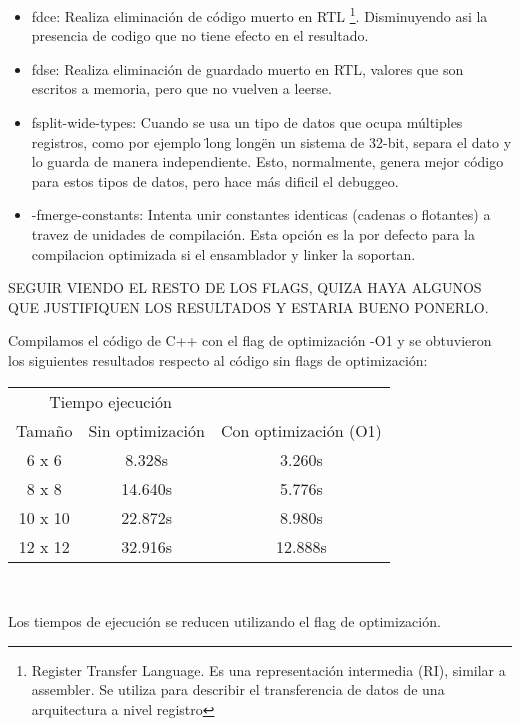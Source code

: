 \begin{itemize}
	\item fdce: Realiza eliminación de código muerto en RTL \footnote{Register Transfer Language. Es una representación intermedia (RI), similar a assembler. Se utiliza para describir el transferencia de datos de una arquitectura a nivel registro}. Disminuyendo asi la presencia de codigo que no tiene efecto en el resultado.
	\item fdse: Realiza eliminación de guardado muerto en RTL, valores que son escritos a memoria, pero que no vuelven a leerse.
	\item fsplit-wide-types: Cuando se usa un tipo de datos que ocupa múltiples registros, como por ejemplo \"long long\" en un sistema de 32-bit, separa el dato y lo guarda de manera independiente. Esto, normalmente, genera mejor código para estos tipos de datos, pero hace más dificil el debuggeo.
	\item -fmerge-constants: Intenta unir constantes identicas (cadenas o flotantes) a travez de unidades de compilación. Esta opción es la por defecto para la compilacion optimizada si el ensamblador y linker la soportan.
\end{itemize}


\colorbox{BurntOrange}{SEGUIR VIENDO EL RESTO DE LOS FLAGS, QUIZA HAYA ALGUNOS QUE JUSTIFIQUEN LOS RESULTADOS Y ESTARIA BUENO PONERLO.}

Compilamos el código de C++ con el flag de optimización -O1 y se obtuvieron los siguientes resultados respecto al código sin flags de optimización:\\

\begin{center}
	\begin{tabular}{ccc}  
		\toprule 
		\multicolumn{2}{c}{Tiempo ejecución} \\
		\cmidrule(r){1-3}
		Tamaño & Sin optimización & Con optimización (O1)  \\
		\midrule
		6 x 6   &	8.328s 	&	3.260s	\\
		8 x 8	&	14.640s	&	5.776s	\\
		10 x 10	&	22.872s	&	8.980s	\\
		12 x 12 &	32.916s &   12.888s \\
		\bottomrule
	\end{tabular}\\
\end{center}

Los tiempos de ejecución se reducen utilizando el flag de optimización.\\

